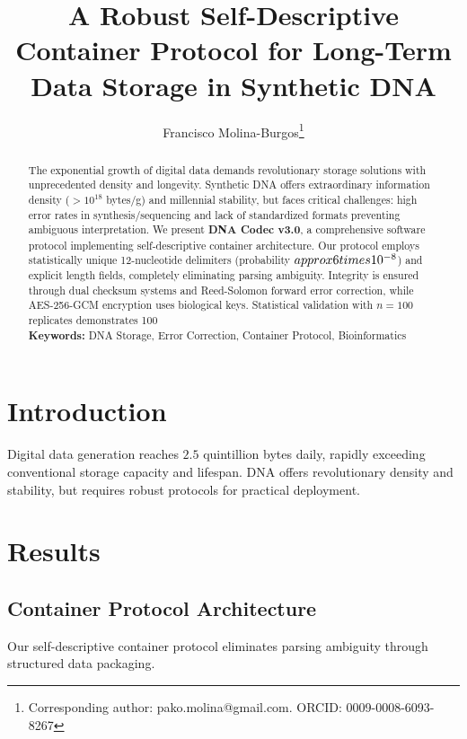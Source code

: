 \documentclass[12pt,a4paper]{article}
\title{\textbf{A Robust Self-Descriptive Container Protocol for Long-Term Data Storage in Synthetic DNA}}
\author[1]{Francisco Molina-Burgos\thanks{Corresponding author: pako.molina@gmail.com. ORCID: 0009-0008-6093-8267}}
\affil[1]{Independent Researcher, Mérida, Yucatán, México CP 97000}
\begin{document}
\maketitle

\begin{abstract}
The exponential growth of digital data demands revolutionary storage solutions with unprecedented density and longevity. Synthetic DNA offers extraordinary information density ($>10^{18}$ bytes/g) and millennial stability, but faces critical challenges: high error rates in synthesis/sequencing and lack of standardized formats preventing ambiguous interpretation. We present \textbf{DNA Codec v3.0}, a comprehensive software protocol implementing self-descriptive container architecture. Our protocol employs statistically unique 12-nucleotide delimiters (probability $\\approx 6 \\times 10^{-8}$) and explicit length fields, completely eliminating parsing ambiguity. Integrity is ensured through dual checksum systems and Reed-Solomon forward error correction, while AES-256-GCM encryption uses biological keys. Statistical validation with $n=100$ replicates demonstrates 100\\%

\textbf{Keywords:} DNA Storage, Error Correction, Container Protocol, Bioinformatics
\end{abstract}

\section{Introduction}
Digital data generation reaches $2.5$ quintillion bytes daily, rapidly exceeding conventional storage capacity and lifespan. DNA offers revolutionary density and stability, but requires robust protocols for practical deployment.

\section{Results}
\subsection{Container Protocol Architecture}
Our self-descriptive container protocol eliminates parsing ambiguity through structured data packaging.
\end{document}
